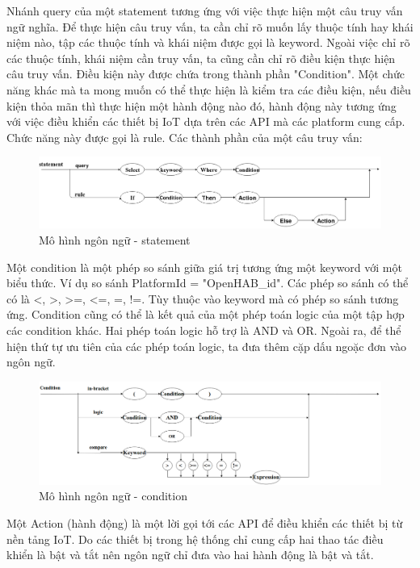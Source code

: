 Nhánh query của một statement tương ứng với việc thực hiện một câu truy vấn ngữ nghĩa. Để thực hiện câu truy vấn, ta cần chỉ rõ muốn lấy thuộc tính hay khái niệm nào, tập các thuộc tính và khái niệm được gọi là keyword. Ngoài việc chỉ rõ các thuộc tính, khái niệm cần truy vấn, ta cũng cần chỉ rõ điều kiện thực hiện câu truy vấn. Điều kiện này được chứa trong thành phần "Condition". Một chức năng khác mà ta mong muốn có thể thực hiện là kiểm tra các điều kiện, nếu điều kiện thỏa mãn thì thực hiện một hành động nào đó, hành động này tương ứng với việc điều khiển các thiết bị IoT dựa trên các API mà các platform cung cấp. Chức năng này được gọi là rule. Các thành phần của một câu truy vấn:


\begin{figure}[h!]
	\center
	\includegraphics[scale=0.3]{image/language_model-statement}
	\caption{Mô hình ngôn ngữ - statement}
\end{figure}


Một condition là một phép so sánh giữa giá trị tương ứng một keyword với một biểu thức. Ví dụ so sánh PlatformId = "OpenHAB\_id". Các phép so sánh có thể có là <, >, >=, <=, =, !=. Tùy thuộc vào keyword mà có phép so sánh tương ứng. Condition cũng có thể là kết quả của một phép toán logic của một tập hợp các condition khác. Hai phép toán logic hỗ trợ là AND và OR. Ngoài ra, để thể hiện thứ tự ưu tiên của các phép toán logic, ta đưa thêm cặp dấu ngoặc đơn vào ngôn ngữ.

\begin{figure}[h!]
	\center
	\includegraphics[scale=0.3]{image/language_model-condition}
	\caption{Mô hình ngôn ngữ - condition}
\end{figure}


Một Action (hành động) là một lời gọi tới các API để điều khiển các thiết bị từ nền tảng IoT. Do các thiết bị trong hệ thống chỉ cung cấp hai thao tác điều khiển là bật và tắt nên ngôn ngữ chỉ đưa vào hai hành động là bật và tắt.

